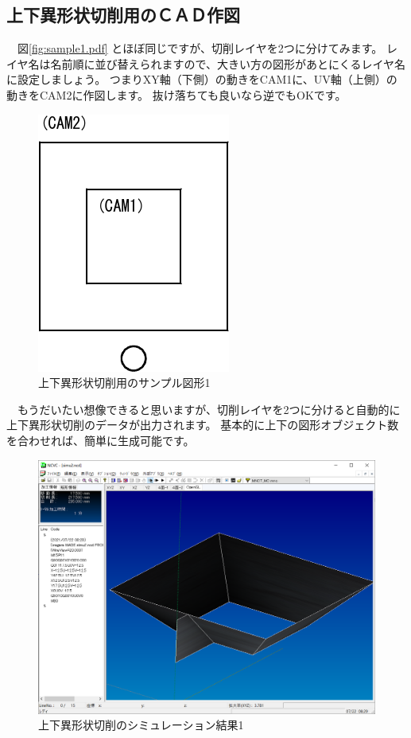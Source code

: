 

\subsection{上下異形状切削用のＣＡＤ作図}
　図\ref{fig:sample1.pdf} とほぼ同じですが、切削レイヤを2つに分けてみます。
レイヤ名は名前順に並び替えられますので、大きい方の図形があとにくるレイヤ名に設定しましょう。
つまりXY軸（下側）の動きをCAM1に、UV軸（上側）の動きをCAM2に作図します。
抜け落ちても良いなら逆でもOKです。

\begin{figure}[H]
\centering
\includegraphics{No2/fig/sample2-crop.pdf}
\caption{上下異形状切削用のサンプル図形1}
\label{fig:sample2.pdf}
\end{figure}

　もうだいたい想像できると思いますが、切削レイヤを2つに分けると自動的に上下異形状切削のデータが出力されます。
基本的に上下の図形オブジェクト数を合わせれば、簡単に生成可能です。

\begin{figure}[H]
\centering
\includegraphics[scale=0.5]{No2/fig/simu2.png}
\caption{上下異形状切削のシミュレーション結果1}
\label{fig:simu2.png}
\end{figure}

